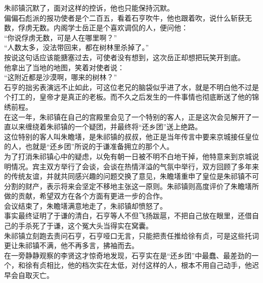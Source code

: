 \begin{multicols}{\theparacolNo}
朱祁镇沉默了，面对这样的控诉，他也只能保持沉默。\\

偏偏石彪派的报功使者是个二百五，看着石亨吹牛，他也跟着吹，说什么斩获无数，俘虏无数。内阁学士岳正是个喜欢调侃的人，便问他：\\

“你说俘虏无数，可是人在哪里啊？”\\

“人数太多，没法带回来，都在树林里杀掉了。”\\

按说这句话应该能搪塞过去，可使者没有想到，这次岳正却想把玩笑开到底。\\

他拿出了当地的地图，笑着对使者说：\\

“这附近都是沙漠啊，哪来的树林？”\\

石亨的拙劣表演远不止如此，可这位老兄的脑袋似乎进了水，就是不明白他不过是个打工的，皇帝才是真正的老板。而不久之后发生的一件事情也彻底断送了他的锦绣前程。\\

在这一年，朱祁镇在自己的宫殿里会见了一个特别的客人，正是这次会见解开了一直以来缠绕着朱祁镇的一个疑团，并最终将“还乡团”送上绝路。\\

这位特别的客人叫朱瞻墡，是朱祁镇的叔叔，他正是当年传言中要来京城接任皇位的人，也就是“还乡团”所说的于谦准备拥立的那个人。\\

为了打消朱祁镇心中的疑虑，以免有朝一日被不明不白地干掉，他特意来到京城说明情况。宾主双方举行了会谈，会谈在热情洋溢的气氛中举行，双方回顾了多年来的传统友谊，并就共同感兴趣的问题交换了意见，朱瞻墡重申了皇位是朱祁镇不可分割的财产，表示将来会坚定不移地主张这一原则。朱祁镇则高度评价了朱瞻墡所做的贡献，希望双方在各个方面有更进一步的合作。\\

会议结束了，朱瞻墡满意地走了，朱祁镇却愤怒了。\\

事实最终证明了于谦的清白，石亨等人不但飞扬跋扈，不把自己放在眼里，还借自己的手杀死了于谦，这个冤大头当得实在窝囊。\\

朱祁镇立刻跑去责问石亨，石亨哑口无言，只能把责任推给徐有贞，可是这些托词更让朱祁镇不满，他不再多言，拂袖而去。\\

在一旁静静观察的李贤这才惊奇地发现，石亨实在是“还乡团”中最蠢、最差劲的一个，和徐有贞相比，他的档次实在太低，对付这样的人，根本不用自己动手，他迟早会自取灭亡。\\


\end{multicols}
